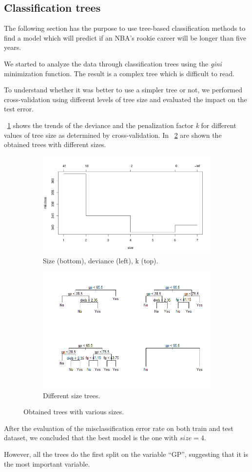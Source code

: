 \subsection{Classification trees}

The following section has the purpose to use tree-based classification methods to find a model which will predict if an NBA's rookie career will be longer than five years.

We started to analyze the data through classification trees using the \textit{gini} minimization function. The result is a complex tree which is difficult to read.

To understand whether it was better to use a simpler tree or not, we performed cross-validation using different levels of tree size and evaluated the impact on the test error.

\Fig~\ref{fig:tree_cv_plot} shows the trends of the deviance and the penalization factor \textit{k} for different values of tree size as determined by cross-validation. In \Fig~\ref{fig:tree_prune_comparison} are shown the obtained trees with different sizes.

\begin{figure}[H]
	\centering
	\begin{subfigure}{.6\textwidth}
		\centering
		\includegraphics[width=0.5\linewidth]{ImageFiles/Classification/Trees/tree_cv_plot}
		\caption{Size (bottom), deviance (left), k (top).}
		\label{fig:tree_cv_plot}
	\end{subfigure}%
	\begin{subfigure}{.6\textwidth}
		\centering
		\includegraphics[width=0.6\linewidth]{ImageFiles/Classification/Trees/tree_prune_comparison}
		\caption{Different size trees.}
		\label{fig:tree_prune_comparison}
	\end{subfigure}
	\caption{Obtained trees with various sizes.}
	\label{fig:treeSize}
\end{figure}

After the evaluation of the misclassification error rate on both train and test dataset, we concluded that the best model is the one with $size = 4$.

However, all the trees do the first split on the variable ``GP'', suggesting that it is the most important variable.
